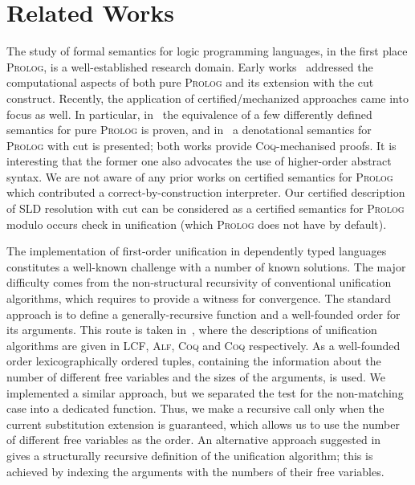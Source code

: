 \section{Related Works}

The study of formal semantics for logic programming languages, in the first place \textsc{Prolog}, is a well-established research domain. Early
works~\cite{JonesMycroftSemantics,DebrayMishraSemantics} addressed the computational aspects of both pure \textsc{Prolog} and its extension
with the cut construct. Recently, the application of certified/mechanized approaches came into focus as well. In particular,
in~\cite{CertifiedPrologEquivalences} the equivalence of a few differently defined semantics
for pure \textsc{Prolog} is proven, and in~\cite{CeritfiedDenotationalCut} a denotational semantics for \textsc{Prolog} with cut is presented; both
works provide \textsc{Coq}-mechanised proofs. It is interesting that the former one also advocates the use of higher-order
abstract syntax. We are not aware of any prior works on certified semantics for \textsc{Prolog} which contributed a correct-by-construction
interpreter. Our certified description of SLD resolution with cut can be considered as a certified semantics for \textsc{Prolog} modulo
occurs check in unification (which \textsc{Prolog} does not have by default).

The implementation of first-order unification in dependently typed languages constitutes a well-known challenge with a number of
known solutions. The major difficulty comes from the non-structural recursivity of conventional unification algorithms, which
requires to provide a witness for convergence. The standard approach is to define a generally-recursive function and a well-founded order
for its arguments. This route is taken in~\cite{MGUinLCF,MGUinMLTT,IdempMGUinCoq,TextbookMGUinCoq}, where the descriptions of
unification algorithms are given in \textsc{LCF}, \textsc{Alf}, \textsc{Coq} and \textsc{Coq} respectively. As a well-founded
order lexicographically ordered tuples, containing the information about the number of different free variables and the sizes of
the arguments, is used. We implemented a similar approach, but we separated the test for the non-matching case into a dedicated
function. Thus, we make a recursive call only when the current substitution extension is guaranteed, which allows us to use the
number of different free variables as the order. An alternative approach suggested in~\cite{StructuralMGU} gives a structurally recursive definition of
the unification algorithm; this is achieved by indexing the arguments with the numbers of their free variables.

